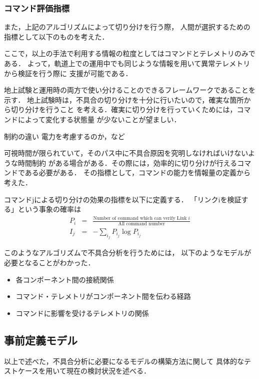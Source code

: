 \documentclass[11pt]{article}
\begin{document}
\subsubsection{コマンド評価指標}
また，上記のアルゴリズムによって切り分けを行う際，
人間が選択するための指標として以下のものを考えた．

ここで，以上の手法で利用する情報の粒度としてはコマンドとテレメトリのみである．%
よって，軌道上での運用中でも同じような情報を用いて異常テレメトリから検証を行う際に
支援が可能である．

地上試験と運用時の両方で使い分けることのできるフレームワークであることを示す．
地上試験時は，不具合の切り分けを十分に行いたいので，確実な箇所から切り分けを行うこと
を考える．確実に切り分けを行っていくためには，コマンドによって変化する状態量
が少ないことが望ましい．

制約の違い
電力を考慮するのか，など

可視時間が限られていて，そのパス中に不具合原因を究明しなければいけないような時間制約
がある場合がある．その際には，効率的に切り分けが行えるコマンドである必要がある．
その指標として，コマンドの能力を情報量の定義から考えた．

コマンドjによる切り分けの効果の指標を以下に定義する．
「リンクiを検証する」という事象の確率は
\begin{eqnarray}
   P_i &=& \frac{\text{Number of command which can verify Link }i}{\text{All command number}}\\
   I_j &=& -\sum_{i_j} P_{i_j}\log{P_{i_j}}     
\end{eqnarray}

このようなアルゴリズムで不具合分析を行うためには，
以下のようなモデルが必要となることがわかった．
\begin{itemize}
   \item 各コンポーネント間の接続関係
   \item コマンド・テレメトリがコンポーネント間を伝わる経路
   \item コマンドに影響を受けるテレメトリの関係
\end{itemize}

\subsection{事前定義モデル}
以上で述べた，不具合分析に必要になるモデルの構築方法に関して
具体的なテストケースを用いて現在の検討状況を述べる．
\end{document}
